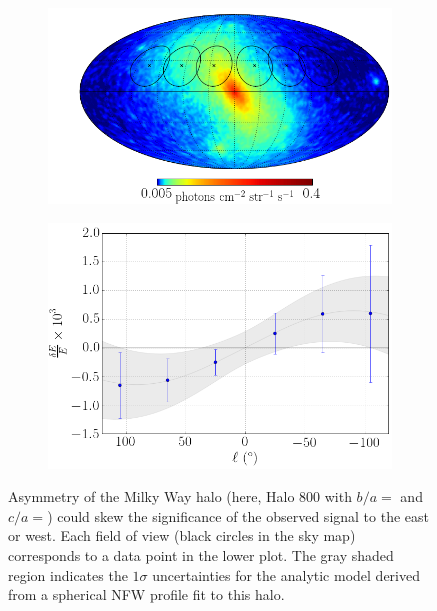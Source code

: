 \documentclass[aps,prd,10pt,twocolumn,superscriptaddress,showpacs]{revtex4-1}
\begin{document}
\begin{figure}[h!]
\centering
\begin{subfigure}[b]{1.0\columnwidth}
	\includegraphics[width=\textwidth]{flux_map_800.png}
\end{subfigure}
\par\medskip
\begin{subfigure}[b]{1.0\columnwidth}
	\includegraphics[width=\textwidth]{de_vs_l_800.png}
\end{subfigure}
\caption{Asymmetry of the Milky Way halo (here, Halo 800 with $b/a=$ and $c/a=$) could skew the significance of the
	observed signal to the east or west. Each field of view (black circles in the sky map) corresponds to a data point in
the lower plot. The gray shaded region indicates the $1\sigma$ uncertainties for the analytic model
derived from a spherical NFW profile fit to this halo.}
\label{fig:triax}
\end{figure}
\end{document}
